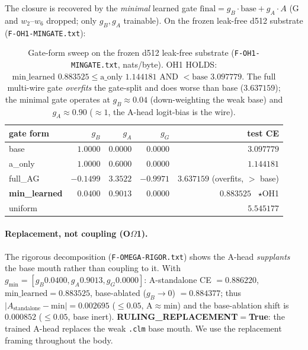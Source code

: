 The closure is recovered by the \emph{minimal} learned gate
$\text{final}=g_B\!\cdot\!\text{base}+g_A\!\cdot\!A$ (G and $w_2$--$w_6$ dropped;
only $g_B,g_A$ trainable). On the frozen leak-free d512 substrate
(\texttt{F-OH1-MINGATE.txt}):
\begin{table}[h]
\centering
\small
\setlength{\tabcolsep}{6pt}
\begin{tabular}{@{}l r r r r@{}}
\toprule
\textbf{gate form} & $g_B$ & $g_A$ & $g_G$ & \textbf{test CE} \\
\midrule
base         & $1.0000$  & $0.0000$ & $0.0000$  & $3.097779$ \\
a\_only      & $1.0000$  & $0.6000$ & $0.0000$  & $1.144181$ \\
full\_AG     & $-0.1499$ & $3.3522$ & $-0.9971$ & $3.637159$ (overfits, $>$ base) \\
\textbf{min\_learned} & $\mathbf{0.0400}$ & $\mathbf{0.9013}$ & $0.0000$ & $\mathbf{0.883525}$ \ $\star$OH1 \\
uniform      &           &          &           & $5.545177$ \\
\bottomrule
\end{tabular}
\caption{Gate-form sweep on the frozen d512 leak-free substrate
(\texttt{F-OH1-MINGATE.txt}, nats/byte). OH1 HOLDS:
$\text{min\_learned }0.883525\le\text{a\_only }1.144181$ AND
$<\text{base }3.097779$. The full multi-wire gate \emph{overfits} the gate-split
and does worse than base ($3.637159$); the minimal gate operates at
$g_B\!\approx\!0.04$ (down-weighting the weak base) and $g_A\!\approx\!0.90$
($\approx\!1$, the A-head logit-bias is the wire).}
\label{tab:omega-mingate}
\end{table}

\paragraph{Replacement, not coupling (O$\Omega$1).} The rigorous decomposition
(\texttt{F-OMEGA-RIGOR.txt}) shows the A-head \emph{supplants} the base mouth
rather than coupling to it. With $g_{\min}=[g_B0.0400, g_A0.9013, g_G0.0000]$:
A-standalone CE $=0.886220$, $\text{min\_learned}=0.883525$, base-ablated
($g_B\!\to\!0$) $=0.884377$; thus $|A_\text{standalone}-\text{min}|=0.002695$
($\le0.05$, A$\approx$min) and the base-ablation shift is $0.000852$ ($\le0.05$,
base inert). \textbf{RULING\_REPLACEMENT$=$True}: the trained A-head replaces the
weak \texttt{.clm} base mouth. We use the replacement framing throughout the body.

